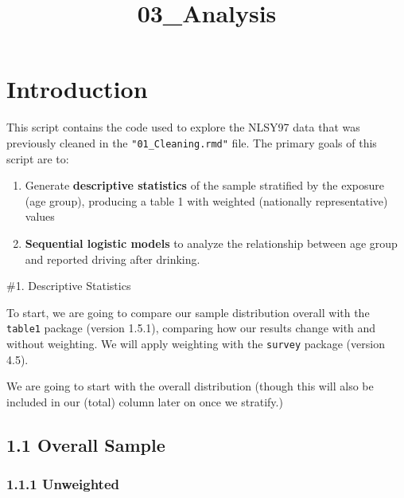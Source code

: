 \documentclass[
]{article}
\title{03\_Analysis}
\author{}
\date{\vspace{-2.5em}}
\begin{document}
\maketitle

{
\setcounter{tocdepth}{3}
\tableofcontents
}
\section{Introduction}\label{introduction}

This script contains the code used to explore the NLSY97 data that was
previously cleaned in the \texttt{"01\_Cleaning.rmd"} file. The primary
goals of this script are to:

\begin{enumerate}
\def\labelenumi{\arabic{enumi}.}
\item
  Generate \textbf{descriptive statistics} of the sample stratified by
  the exposure (age group), producing a table 1 with weighted
  (nationally representative) values
\item
  \textbf{Sequential logistic models} to analyze the relationship
  between age group and reported driving after drinking.
\end{enumerate}

\#1. Descriptive Statistics

To start, we are going to compare our sample distribution overall with
the \texttt{table1} package (version 1.5.1), comparing how our results
change with and without weighting. We will apply weighting with the
\texttt{survey} package (version 4.5).

We are going to start with the overall distribution (though this will
also be included in our (total) column later on once we stratify.)

\subsection{1.1 Overall Sample}\label{overall-sample}

\subsubsection{1.1.1 Unweighted}\label{unweighted}
\end{document}
